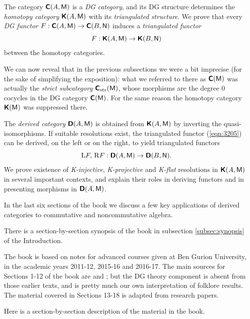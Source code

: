 The category $\boldsymbol{\mathsf{C}}(A, \operatorname{\mathsf{M}})$ is a {\em DG category}, and 
its DG structure determines the {\em homotopy category} 
$\boldsymbol{\mathsf{K}}(A, \operatorname{\mathsf{M}})$ with its {\em triangulated structure}. 
We prove that every {\em DG functor} 
$F : \boldsymbol{\mathsf{C}}(A, \operatorname{\mathsf{M}}) \to \boldsymbol{\mathsf{C}}(B, \operatorname{\mathsf{N}})$
induces a {\em triangulated functor} 
\begin{equation} \label{eqn:3205}
F : \boldsymbol{\mathsf{K}}(A, \operatorname{\mathsf{M}}) \to \boldsymbol{\mathsf{K}}(B, \operatorname{\mathsf{N}})
\end{equation}
between the homotopy categories. 

We can now reveal that in the previous subsections we were a bit imprecise (for 
the sake of simplifying the exposition): what we referred to there as  
$\boldsymbol{\mathsf{C}}(\operatorname{\mathsf{M}})$ was actually the {\em strict subcategory}
$\boldsymbol{\mathsf{C}}_{\mathrm{str}}(\operatorname{\mathsf{M}})$, whose morphisms are the degree $0$ cocycles in 
the DG category $\boldsymbol{\mathsf{C}}(\operatorname{\mathsf{M}})$. For the same reason the homotopy 
category $\boldsymbol{\mathsf{K}}(\operatorname{\mathsf{M}})$ was suppressed there. 

The {\em derived category} $\boldsymbol{\mathsf{D}}(A, \operatorname{\mathsf{M}})$ is obtained 
from $\boldsymbol{\mathsf{K}}(A, \operatorname{\mathsf{M}})$ by inverting the quasi-isomorphisms.
If suitable resolutions exist, the triangulated functor (\ref{eqn:3205}) 
can be derived, on the left or on the right, to yield triangulated functors
\begin{equation} \label{eqn:5011}
\mathrm{L} F, \, \mathrm{R} F : 
\boldsymbol{\mathsf{D}}(A, \operatorname{\mathsf{M}}) \to \boldsymbol{\mathsf{D}}(B, \operatorname{\mathsf{N}}) .
\end{equation}
We prove existence of {\em K-injective}, {\em K-projective} and {\em K-flat} 
resolutions in $\boldsymbol{\mathsf{K}}(A, \operatorname{\mathsf{M}})$ in several important contexts,
and explain their roles in deriving functors and in presenting morphisms
in $\boldsymbol{\mathsf{D}}(A, \operatorname{\mathsf{M}})$.

In the last six sections of the book we discuss a few key applications of 
derived categories to commutative and noncommutative algebra. 

There is a section-by-section synopsis of the book in subsection 
\ref{subsec:synopsis} of the Introduction. 

The book is based on notes for advanced courses given at Ben Gurion 
University, in the academic years 2011-12, 2015-16 and 2016-17. 
The main sources for Sections 1-12 of the book are \cite{RD} and \cite{KaSc1}; 
but the DG theory component is absent from those earlier texts, and is pretty 
much our own interpretation of folklore results. The material covered in 
Sections 13-18 is adapted from research papers. 


 \label{subsec:synopsis}
Here is a section-by-section description of the material in the book. 

